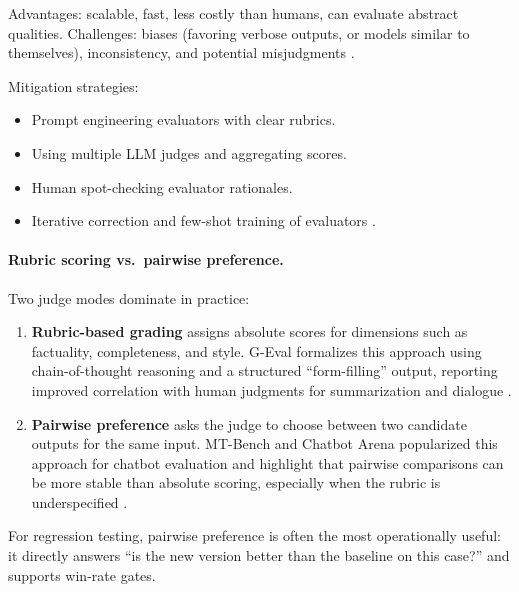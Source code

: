Advantages: scalable, fast, less costly than humans, can evaluate abstract qualities.  
Challenges: biases (favoring verbose outputs, or models similar to themselves), inconsistency, and potential misjudgments \cite{zheng2023judge}.  

Mitigation strategies:  
\begin{itemize}
    \item Prompt engineering evaluators with clear rubrics.  
    \item Using multiple LLM judges and aggregating scores.  
    \item Human spot-checking evaluator rationales.  
    \item Iterative correction and few-shot training of evaluators \cite{changelogLangchain}.  
\end{itemize}  


\paragraph{Rubric scoring vs.\ pairwise preference.}
Two judge modes dominate in practice:
\begin{enumerate}[leftmargin=1.6em, itemsep=2pt]
    \item \textbf{Rubric-based grading} assigns absolute scores for dimensions such as factuality, completeness, and style. G-Eval formalizes this approach using chain-of-thought reasoning and a structured ``form-filling'' output, reporting improved correlation with human judgments for summarization and dialogue \cite{liu2023geval}.
    \item \textbf{Pairwise preference} asks the judge to choose between two candidate outputs for the same input. MT-Bench and Chatbot Arena popularized this approach for chatbot evaluation and highlight that pairwise comparisons can be more stable than absolute scoring, especially when the rubric is underspecified \cite{zheng2023judge}.
\end{enumerate}
For regression testing, pairwise preference is often the most operationally useful: it directly answers ``is the new version better than the baseline on this case?'' and supports win-rate gates.

